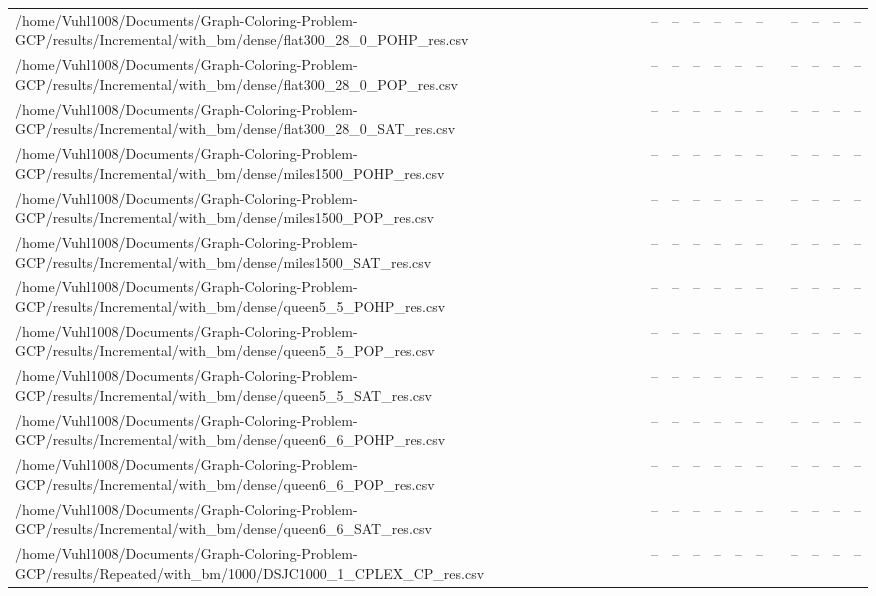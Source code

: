 \begin{table}[htbp]
\begin{tabular}{llllllllllll}
/home/Vuhl1008/Documents/Graph-Coloring-Problem-GCP/results/Incremental/with\_bm/dense/flat300\_28\_0\_POHP\_res.csv & -- & -- & -- & -- & -- & -- & {} & -- & -- & -- & -- \\
/home/Vuhl1008/Documents/Graph-Coloring-Problem-GCP/results/Incremental/with\_bm/dense/flat300\_28\_0\_POP\_res.csv & -- & -- & -- & -- & -- & -- & {} & -- & -- & -- & -- \\
/home/Vuhl1008/Documents/Graph-Coloring-Problem-GCP/results/Incremental/with\_bm/dense/flat300\_28\_0\_SAT\_res.csv & -- & -- & -- & -- & -- & -- & {} & -- & -- & -- & -- \\
/home/Vuhl1008/Documents/Graph-Coloring-Problem-GCP/results/Incremental/with\_bm/dense/miles1500\_POHP\_res.csv & -- & -- & -- & -- & -- & -- & {} & -- & -- & -- & -- \\
/home/Vuhl1008/Documents/Graph-Coloring-Problem-GCP/results/Incremental/with\_bm/dense/miles1500\_POP\_res.csv & -- & -- & -- & -- & -- & -- & {} & -- & -- & -- & -- \\
/home/Vuhl1008/Documents/Graph-Coloring-Problem-GCP/results/Incremental/with\_bm/dense/miles1500\_SAT\_res.csv & -- & -- & -- & -- & -- & -- & {} & -- & -- & -- & -- \\
/home/Vuhl1008/Documents/Graph-Coloring-Problem-GCP/results/Incremental/with\_bm/dense/queen5\_5\_POHP\_res.csv & -- & -- & -- & -- & -- & -- & {} & -- & -- & -- & -- \\
/home/Vuhl1008/Documents/Graph-Coloring-Problem-GCP/results/Incremental/with\_bm/dense/queen5\_5\_POP\_res.csv & -- & -- & -- & -- & -- & -- & {} & -- & -- & -- & -- \\
/home/Vuhl1008/Documents/Graph-Coloring-Problem-GCP/results/Incremental/with\_bm/dense/queen5\_5\_SAT\_res.csv & -- & -- & -- & -- & -- & -- & {} & -- & -- & -- & -- \\
/home/Vuhl1008/Documents/Graph-Coloring-Problem-GCP/results/Incremental/with\_bm/dense/queen6\_6\_POHP\_res.csv & -- & -- & -- & -- & -- & -- & {} & -- & -- & -- & -- \\
/home/Vuhl1008/Documents/Graph-Coloring-Problem-GCP/results/Incremental/with\_bm/dense/queen6\_6\_POP\_res.csv & -- & -- & -- & -- & -- & -- & {} & -- & -- & -- & -- \\
/home/Vuhl1008/Documents/Graph-Coloring-Problem-GCP/results/Incremental/with\_bm/dense/queen6\_6\_SAT\_res.csv & -- & -- & -- & -- & -- & -- & {} & -- & -- & -- & -- \\
/home/Vuhl1008/Documents/Graph-Coloring-Problem-GCP/results/Repeated/with\_bm/1000/DSJC1000\_1\_CPLEX\_CP\_res.csv & -- & -- & -- & -- & -- & -- & {} & -- & -- & -- & -- \\

\end{tabular}
\end{table}
